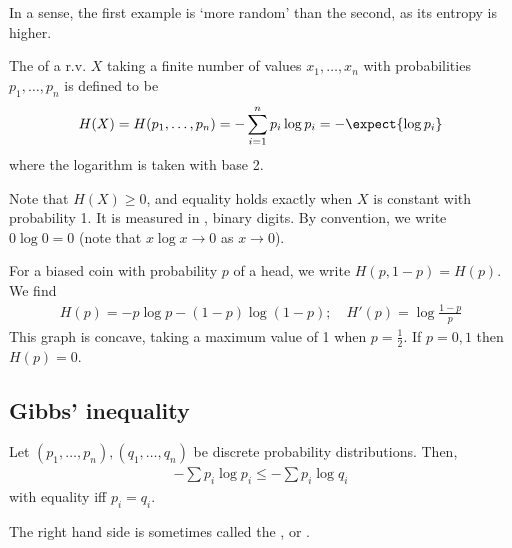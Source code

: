 In a sense, the first example is `more random' than the second, as its entropy is higher.

\begin{definition}[Entropy]
    The  of a r.v. $X$ taking a finite number of values $x_1, \dots, x_n$ with probabilities $p_1, \dots, p_n$ is defined to be
    \begin{align*}
        H(X) = H(p_1, \dots, p_n) = -\sum_{i=1}^n p_i \log p_i = -\expect{\log p_i}
    \end{align*}
    where the logarithm is taken with base 2.
\end{definition}

Note that $H(X) \geq 0$, and equality holds exactly when $X$ is constant with probability 1.
It is measured in , binary digits.
By convention, we write $0 \log 0 = 0$ (note that $x \log x \to 0$ as $x \to 0$).

\begin{example}
    For a biased coin with probability $p$ of a head, we write $H(p,1-p) = H(p)$.
    We find
    \begin{align*}
        H(p) = -p\log p - (1-p)\log(1-p);\quad H'(p) = \log \frac{1-p}{p}
    \end{align*}
    This graph is concave, taking a maximum value of 1 when $p = \frac{1}{2}$.
    If $p = 0, 1$ then $H(p) = 0$.
\end{example}

\subsection{Gibbs' inequality}
\begin{proposition}
    Let $(p_1, \dots, p_n), (q_1, \dots, q_n)$ be discrete probability distributions.
    Then,
    \begin{align*}
        -\sum p_i \log p_i \leq -\sum p_i \log q_i
    \end{align*}
    with equality iff $p_i = q_i$.
\end{proposition}

The right hand side is sometimes called the , or .

